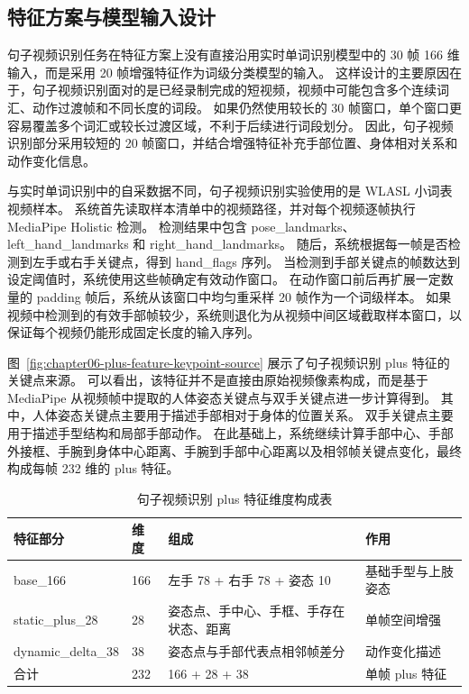 
\subsection{特征方案与模型输入设计}

句子视频识别任务在特征方案上没有直接沿用实时单词识别模型中的 30 帧 166 维输入，而是采用 20 帧增强特征作为词级分类模型的输入。
这样设计的主要原因在于，句子视频识别面对的是已经录制完成的短视频，视频中可能包含多个连续词汇、动作过渡帧和不同长度的词段。
如果仍然使用较长的 30 帧窗口，单个窗口更容易覆盖多个词汇或较长过渡区域，不利于后续进行词段划分。
因此，句子视频识别部分采用较短的 20 帧窗口，并结合增强特征补充手部位置、身体相对关系和动作变化信息。

与实时单词识别中的自采数据不同，句子视频识别实验使用的是 WLASL 小词表视频样本。
系统首先读取样本清单中的视频路径，并对每个视频逐帧执行 MediaPipe Holistic 检测。
检测结果中包含 pose\_landmarks、left\_hand\_landmarks 和 right\_hand\_landmarks。
随后，系统根据每一帧是否检测到左手或右手关键点，得到 hand\_flags 序列。
当检测到手部关键点的帧数达到设定阈值时，系统使用这些帧确定有效动作窗口。
在动作窗口前后再扩展一定数量的 padding 帧后，系统从该窗口中均匀重采样 20 帧作为一个词级样本。
如果视频中检测到的有效手部帧较少，系统则退化为从视频中间区域截取样本窗口，以保证每个视频仍能形成固定长度的输入序列。


图~\ref{fig:chapter06-plus-feature-keypoint-source} 展示了句子视频识别 plus 特征的关键点来源。
可以看出，该特征并不是直接由原始视频像素构成，而是基于 MediaPipe 从视频帧中提取的人体姿态关键点与双手关键点进一步计算得到。
其中，人体姿态关键点主要用于描述手部相对于身体的位置关系。
双手关键点主要用于描述手型结构和局部手部动作。
在此基础上，系统继续计算手部中心、手部外接框、手腕到身体中心距离、手腕到手部中心距离以及相邻帧关键点变化，最终构成每帧 232 维的 plus 特征。

\begin{longtable}{L{0.22\textwidth} L{0.12\textwidth} L{0.34\textwidth} L{0.24\textwidth}}
  \caption{句子视频识别 plus 特征维度构成表}
  \label{tab:chapter06-plus-feature-dim}\\
  \toprule
  特征部分 & 维度 & 组成 & 作用 \\
  \midrule
  base\_166 & 166 & 左手 78 + 右手 78 + 姿态 10 & 基础手型与上肢姿态 \\
  static\_plus\_28 & 28 & 姿态点、手中心、手框、手存在状态、距离 & 单帧空间增强 \\
  dynamic\_delta\_38 & 38 & 姿态点与手部代表点相邻帧差分 & 动作变化描述 \\
  合计 & 232 & 166 + 28 + 38 & 单帧 plus 特征 \\
  \bottomrule
\end{longtable}

